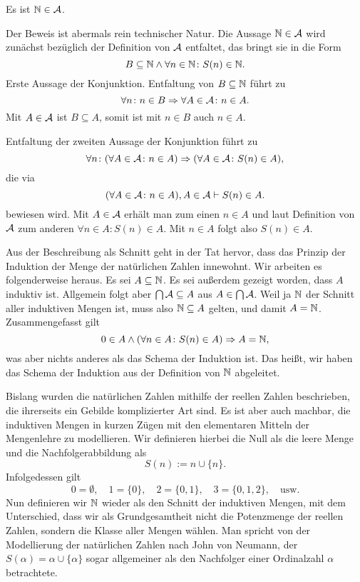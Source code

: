 \begin{Satz}\label{N-is-inductive}
Es ist $\mathbb N\in\mathcal{A}$.
\end{Satz}
\begin{Beweis}
Der Beweis ist abermals rein technischer Natur. Die Aussage
$\mathbb N\in\mathcal{A}$ wird zunächst bezüglich der Definition von
$\mathcal{A}$ entfaltet, das bringt sie in die Form
\[\textstyle B\subseteq\mathbb N\land\forall n\in\mathbb N\colon S(n)\in\mathbb N.\]
Erste Aussage der Konjunktion. Entfaltung von $B\subseteq\mathbb N$ führt zu
\[\forall n\colon n\in B\Rightarrow \forall A\in\mathcal{A}\colon n\in A.\]
Mit $A\in\mathcal{A}$ ist $B\subseteq A$, somit ist mit $n\in B$ auch
$n\in A$.

Entfaltung der zweiten Aussage der Konjunktion führt zu
\[\forall n\colon (\forall A\in\mathcal{A}\colon n\in A)\Rightarrow
(\forall A\in\mathcal{A}\colon S(n)\in A),\]
die via
\[(\forall A\in\mathcal{A}\colon n\in A), A\in\mathcal{A}\vdash S(n)\in A.\]
bewiesen wird. Mit $A\in\mathcal{A}$ erhält man zum einen $n\in A$ und
laut Definition von $\mathcal{A}$ zum anderen $\forall n\in A\colon S(n)\in A$.
Mit $n\in A$ folgt also $S(n)\in A$.\,\qedsymbol
\end{Beweis}

\noindent
Aus der Beschreibung als Schnitt geht in der Tat hervor, dass das
Prinzip der Induktion der Menge der natürlichen Zahlen innewohnt.
Wir arbeiten es folgenderweise heraus. Es sei $A\subseteq\mathbb N$. Es sei
außerdem gezeigt worden, dass $A$ induktiv ist. Allgemein folgt aber
$\bigcap\mathcal{A}\subseteq A$ aus $A\in\bigcap\mathcal{A}$. Weil ja
$\mathbb N$ der Schnitt aller induktiven Mengen ist, muss also $\mathbb N\subseteq A$
gelten, und damit $A=\mathbb N$. Zusammengefasst gilt
\[0\in A\land (\forall n\in A\colon S(n)\in A)\Rightarrow A = \mathbb N,\]
was aber nichts anderes als das Schema der Induktion ist. Das heißt,
wir haben das Schema der Induktion aus der Definition von $\mathbb N$ abgeleitet.

Bislang wurden die natürlichen Zahlen mithilfe der reellen Zahlen
beschrieben, die ihrerseits ein Gebilde komplizierter Art sind.
Es ist aber auch machbar, die induktiven Mengen in kurzen Zügen mit
den elementaren Mitteln der Mengenlehre zu modellieren. Wir definieren
hierbei die Null als die leere Menge und die Nachfolgerabbildung als
\[S(n) := n\cup \{n\}.\]
Infolgedessen gilt
\[0 = \emptyset,\quad 1 = \{0\},\quad 2 = \{0, 1\},\quad
3 = \{0, 1, 2\},\quad\text{usw.}\]
Nun definieren wir $\mathbb N$ wieder als den Schnitt der induktiven Mengen,
mit dem Unterschied, dass wir als Grundgesamtheit nicht die Potenzmenge
der reellen Zahlen, sondern die Klasse aller Mengen wählen. Man spricht
von der Modellierung der natürlichen Zahlen nach John von Neumann,
der $S(\alpha) = \alpha\cup\{\alpha\}$ sogar allgemeiner als den
Nachfolger einer Ordinalzahl $\alpha$ betrachtete.

